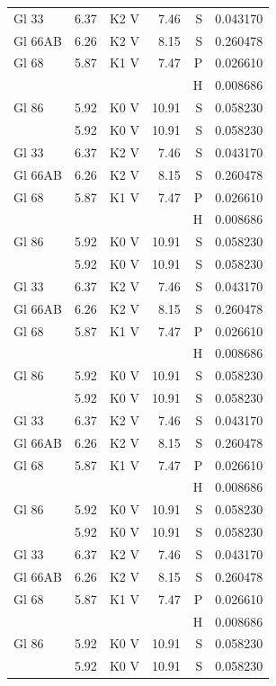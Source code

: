 \documentclass{aa}
\begin{document}
\begin{appendix}
\begin{longtable}{lllrrr}
Gl 33    & 6.37 & K2 V & 7.46 & S & 0.043170\\
Gl 66AB  & 6.26 & K2 V & 8.15 & S & 0.260478\\
Gl 68    & 5.87 & K1 V & 7.47 & P & 0.026610\\
         &      &      &      & H & 0.008686\\
Gl 86    & 5.92 & K0 V & 10.91& S & 0.058230\\
         & 5.92 & K0 V & 10.91& S & 0.058230\\
Gl 33    & 6.37 & K2 V & 7.46 & S & 0.043170\\
Gl 66AB  & 6.26 & K2 V & 8.15 & S & 0.260478\\
Gl 68    & 5.87 & K1 V & 7.47 & P & 0.026610\\
         &      &      &      & H & 0.008686\\
Gl 86    & 5.92 & K0 V & 10.91& S & 0.058230\\            & 5.92 & K0 V & 10.91& S & 0.058230\\
Gl 33    & 6.37 & K2 V & 7.46 & S & 0.043170\\
Gl 66AB  & 6.26 & K2 V & 8.15 & S & 0.260478\\
Gl 68    & 5.87 & K1 V & 7.47 & P & 0.026610\\
         &      &      &      & H & 0.008686\\
Gl 86    & 5.92 & K0 V & 10.91& S & 0.058230\\
         & 5.92 & K0 V & 10.91& S & 0.058230\\
Gl 33    & 6.37 & K2 V & 7.46 & S & 0.043170\\
Gl 66AB  & 6.26 & K2 V & 8.15 & S & 0.260478\\
Gl 68    & 5.87 & K1 V & 7.47 & P & 0.026610\\
         &      &      &      & H & 0.008686\\
Gl 86    & 5.92 & K0 V & 10.91& S & 0.058230\\            & 5.92 & K0 V & 10.91& S & 0.058230\\
Gl 33    & 6.37 & K2 V & 7.46 & S & 0.043170\\
Gl 66AB  & 6.26 & K2 V & 8.15 & S & 0.260478\\
Gl 68    & 5.87 & K1 V & 7.47 & P & 0.026610\\
         &      &      &      & H & 0.008686\\
Gl 86    & 5.92 & K0 V & 10.91& S & 0.058230\\            & 5.92 & K0 V & 10.91& S & 0.058230\\

\end{longtable}
\end{appendix}
\end{document}
